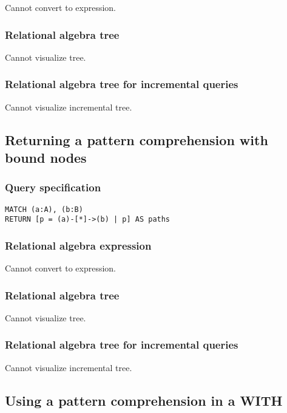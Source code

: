 Cannot convert to expression.

\subsubsection*{Relational algebra tree}

Cannot visualize tree.

\subsubsection*{Relational algebra tree for incremental queries}

Cannot visualize incremental tree.

\subsection{Returning a pattern comprehension with bound nodes}

\subsubsection*{Query specification}

\begin{lstlisting}
MATCH (a:A), (b:B)
RETURN [p = (a)-[*]->(b) | p] AS paths
\end{lstlisting}

\subsubsection*{Relational algebra expression}

Cannot convert to expression.

\subsubsection*{Relational algebra tree}

Cannot visualize tree.

\subsubsection*{Relational algebra tree for incremental queries}

Cannot visualize incremental tree.

\subsection{Using a pattern comprehension in a WITH}

